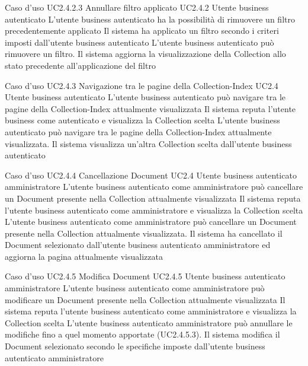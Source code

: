 \UCtitle
{Caso d'uso UC2.4.2.3}
{Annullare filtro applicato}
\UC
{UC2.4.2}
{Utente business autenticato}
{L'utente business autenticato ha la possibilità di rimuovere un filtro precedentemente applicato}
{Il sistema ha applicato un filtro secondo i criteri imposti dall'utente business autenticato}
\scenario
{L'utente business autenticato può rimuovere un filtro.}
\post
{Il sistema aggiorna la visualizzazione della Collection allo stato precedente all'applicazione del filtro}


\UCtitle
{Caso d'uso UC2.4.3}
{Navigazione tra le pagine della Collection-Index}
\UC
{UC2.4}
{Utente business autenticato}
{L'utente business autenticato può navigare tra le pagine della Collection-Index attualmente visualizzata}
{Il sistema reputa l'utente business come autenticato e visualizza la Collection scelta}
\scenario
{L'utente business autenticato può navigare tra le pagine della Collection-Index attualmente visualizzata.}
\post
{Il sistema visualizza un'altra Collection scelta dall'utente business autenticato}

\UCtitle
{Caso d'uso UC2.4.4}
{Cancellazione Document}
\UC
{UC2.4}
{Utente business autenticato amministratore}
{L'utente business autenticato come amministratore può cancellare un Document presente nella Collection attualmente visualizzata}
{Il sistema reputa l'utente business autenticato come amministratore e visualizza la Collection scelta}
\scenario
{L'utente business autenticato come amministratore può cancellare un Document presente nella Collection attualmente visualizzata.}
\post
{Il sistema ha cancellato il Document selezionato dall'utente business autenticato amministratore ed aggiorna la pagina attualmente visualizzata}

\UCtitle
{Caso d'uso UC2.4.5}
{Modifica Document}
\UC
{UC2.4.5}
{Utente business autenticato amministratore}
{L'utente business autenticato come amministratore può modificare un Document presente nella Collection attualmente visualizzata}
{Il sistema reputa l'utente business autenticato come amministratore e visualizza la Collection scelta}
\estensioni
{L'utente business autenticato amministratore può annullare le modifiche fino a quel momento apportate (UC2.4.5.3).}
\post
{Il sistema modifica il Document selezionato secondo le specifiche imposte dall'utente business autenticato amministratore}


